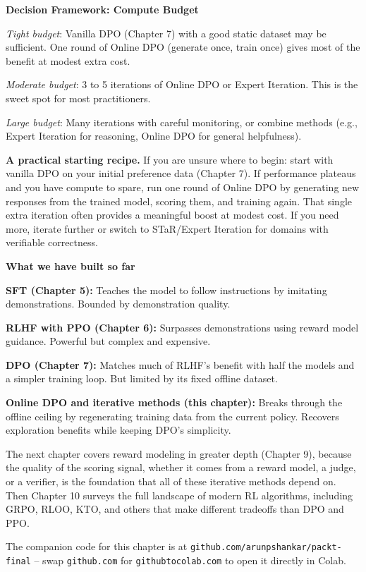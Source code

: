 \begin{chapterenv}
\begin{infobox}
\textbf{Decision Framework: Compute Budget}

\textit{Tight budget}: Vanilla DPO (Chapter 7) with a good static dataset may be sufficient. One round of Online DPO (generate once, train once) gives most of the benefit at modest extra cost.

\textit{Moderate budget}: 3 to 5 iterations of Online DPO or Expert Iteration. This is the sweet spot for most practitioners.

\textit{Large budget}: Many iterations with careful monitoring, or combine methods (e.g., Expert Iteration for reasoning, Online DPO for general helpfulness).
\end{infobox}

\textbf{A practical starting recipe.} If you are unsure where to begin: start with vanilla DPO on your initial preference data (Chapter 7). If performance plateaus and you have compute to spare, run one round of Online DPO by generating new responses from the trained model, scoring them, and training again. That single extra iteration often provides a meaningful boost at modest cost. If you need more, iterate further or switch to STaR/Expert Iteration for domains with verifiable correctness.

\begin{infobox}
\textbf{What we have built so far}

\textbf{SFT (Chapter 5):} Teaches the model to follow instructions by imitating demonstrations. Bounded by demonstration quality.

\textbf{RLHF with PPO (Chapter 6):} Surpasses demonstrations using reward model guidance. Powerful but complex and expensive.

\textbf{DPO (Chapter 7):} Matches much of RLHF's benefit with half the models and a simpler training loop. But limited by its fixed offline dataset.

\textbf{Online DPO and iterative methods (this chapter):} Breaks through the offline ceiling by regenerating training data from the current policy. Recovers exploration benefits while keeping DPO's simplicity.

The next chapter covers reward modeling in greater depth (Chapter 9), because the quality of the scoring signal, whether it comes from a reward model, a judge, or a verifier, is the foundation that all of these iterative methods depend on. Then Chapter 10 surveys the full landscape of modern RL algorithms, including GRPO, RLOO, KTO, and others that make different tradeoffs than DPO and PPO.
\end{infobox}


The companion code for this chapter is at \texttt{github.com/arunpshankar/packt-final} -- swap \texttt{github.com} for \texttt{githubtocolab.com} to open it directly in Colab.

\end{chapterenv}